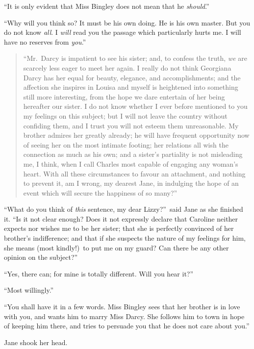 \documentclass[12pt,english,oneside]{book}
\begin{document}
{}``It is only evident that Miss Bingley does not mean that he \textit{should}.''

{}``Why will you think so? It must be his own doing. He is his own
master. But you do not know \textit{all}. I \textit{will} read you
the passage which particularly hurts me. I will have no reserves from
\textit{you}.''

\begin{quotation}
{}``Mr.\ Darcy is impatient to see his sister; and, to confess the
truth, \textit{we} are scarcely less eager to meet her again. I really
do not think Georgiana Darcy has her equal for beauty, elegance, and
accomplishments; and the affection she inspires in Louisa and myself
is heightened into something still more interesting, from the hope
we dare entertain of her being hereafter our sister. I do not know
whether I ever before mentioned to you my feelings on this subject;
but I will not leave the country without confiding them, and I trust
you will not esteem them unreasonable. My brother admires her greatly
already; he will have frequent opportunity now of seeing her on the
most intimate footing; her relations all wish the connection as much
as his own; and a sister's partiality is not misleading me, I think,
when I call Charles most capable of engaging any woman's heart. With
all these circumstances to favour an attachment, and nothing to prevent
it, am I wrong, my dearest Jane, in indulging the hope of an event
which will secure the happiness of so many?''\ 
\end{quotation}
{}``What do you think of \textit{this} sentence, my dear Lizzy?''\ 
said Jane as she finished it. {}``Is it not clear enough? Does it
not expressly declare that Caroline neither expects nor wishes me
to be her sister; that she is perfectly convinced of her brother's
indifference; and that if she suspects the nature of my feelings for
him, she means (most kindly!)\ to put me on my guard? Can there be
any other opinion on the subject?''\ 

{}``Yes, there can; for mine is totally different. Will you hear
it?''\ 

{}``Most willingly.''

{}``You shall have it in a few words. Miss Bingley sees that her
brother is in love with you, and wants him to marry Miss Darcy. She
follows him to town in hope of keeping him there, and tries to persuade
you that he does not care about you.''

Jane shook her head.
\end{document}
